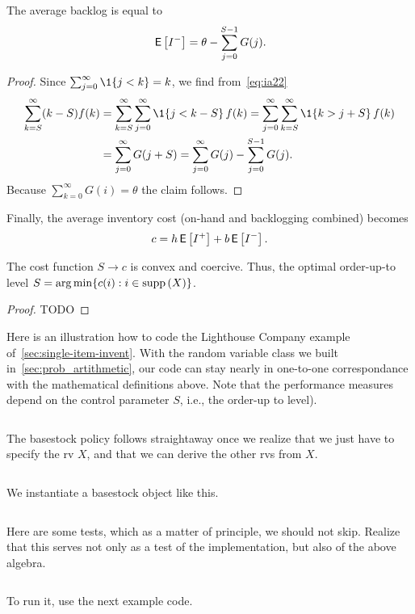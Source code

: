 \documentclass[stochastic-or.tex]{subfiles}
\begin{document}
\begin{lemma}
\label{lem:3}
The average backlog is equal to
\begin{equation*}
   \,\mathsf{E}\left[I^-\right] = \theta - \sum_{j=0}^{S-1} G(j).
\end{equation*}
\end{lemma}
\begin{proof} Since $\sum_{j=0}^\infty \1{j< k} = k$, we find from~\cref{eq:ia22}
\begin{align*}
   \sum_{k=S}^\infty (k-S) f(k)
   &= \sum_{k=S}^\infty\sum_{j=0}^\infty \1{j < k-S}\, f(k)   =
    \sum_{j=0}^\infty \sum_{k=S}^\infty \1{k > j +S}\, f(k)\\
   &= \sum_{j=0}^\infty  G(j+S)
   = \sum_{j=0}^\infty  G(j) - \sum_{j=0}^{S-1} G(j).
\end{align*}
Because $\sum_{k=0}^\infty G(i) = \theta$ the claim follows.
\end{proof}

Finally, the average inventory cost (on-hand and backlogging combined) becomes
\begin{equation*}
c =  h \,\mathsf{E}\left[I^{+}\right] +  b \,\mathsf{E}\left[I^-\right].
\end{equation*}


\begin{theorem}
The cost function $S\to c$ is convex and coercive. Thus, the optimal order-up-to level $S = \operatorname*{arg\,min}\{c(i) : i \in \mathrm{supp}\left(X\right)\}$.
\end{theorem}
\begin{proof}
TODO
\end{proof}



Here is an illustration how to code the Lighthouse Company example of~\cref{sec:single-item-invent}.
With the random variable class we built in~\cref{sec:prob_artithmetic}, our code can stay nearly in one-to-one correspondance with the mathematical definitions above. Note that the performance measures depend on the control parameter $S$, i.e., the order-up to level).
\inputminted[firstline=2, lastline=5]{python}{../code/lighthouse.py} %

The basestock policy follows straightaway once we realize that we just have to specify the rv $X$, and that we can derive the other rvs from $X$.
\inputminted[firstline=11, lastline=43]{python}{../code/lighthouse.py} %
We instantiate a basestock object like this.
\inputminted[firstline=50, lastline=58]{python}{../code/lighthouse.py} %
Here are some tests, which as a matter of principle, we should not skip.
Realize that this serves not only as a test of the implementation, but also of the above algebra.
\inputminted[firstline=62, lastline=67]{python}{../code/lighthouse.py} %
To run it, use the next example code.
\inputminted[firstline=71, lastline=73]{python}{../code/lighthouse.py} %
\end{document}
